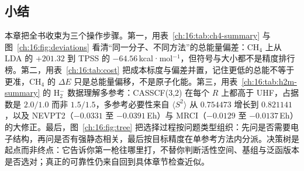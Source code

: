 \subsection*{小结}
本章把全书收束为三个操作步骤。第一，用表~\ref{ch:16:tab:ch4-summary} 与图~\ref{ch:16:fig:deviations} 看清“同一分子、不同方法”的总能量偏差：CH$_4$ 上从 LDA 的 $+201.32$ 到 TPSS 的 $-64.56$\,kcal·mol$^{-1}$，但符号与大小都不是精度排行榜。第二，用表~\ref{ch:16:tab:cost} 把成本标度与偏差并置，记住更低的总能不等于更准，CH$_4$ 的 $\Delta E$ 只是总能量偏移，不是原子化能。第三，用表~\ref{ch:16:tab:h2m-summary} 的 H$_2^-$ 数据理解多参考：CASSCF(3,2) 在每个 $R$ 上都高于 UHF，占据数是 $2.0/1.0$ 而非 $1.5/1.5$，多参考必要性来自 $\langle S^2\rangle$ 从 $0.754473$ 增长到 $0.821141$，以及 NEVPT2（$-0.0331$ 至 $-0.0391$\,Eh）与 MRCI（$-0.0129$ 至 $-0.0137$\,Eh）的大修正。最后，图~\ref{ch:16:fig:tree} 把选择过程按问题类型组织：先问是否需要电子结构，再问是否有强静态相关，最后按目标精度在单参考方法内分派。决策树是起点而非终点：它告诉你第一枪往哪里打，不替你判断活性空间、基组与泛函版本是否选对；真正的可靠性仍来自回到具体章节检查近似。

